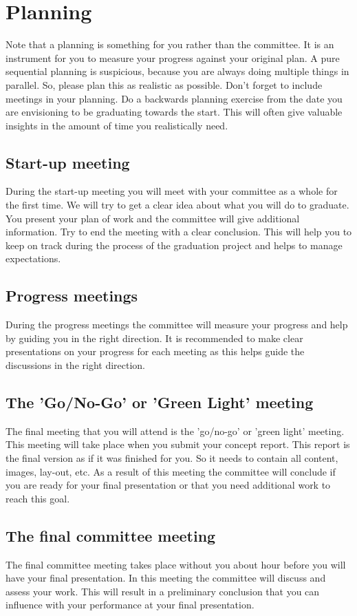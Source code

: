 \documentclass{latex-format/stylesheets/BEMNextstyle}
\begin{document}
\section*{Planning}
\label{sec:planning}
Note that a planning is something for you rather than the committee. It is an instrument for you to measure your progress against your original plan. A pure sequential planning is suspicious, because you are always doing multiple things in parallel. So, please plan this as realistic as possible. Don't forget to include meetings in your planning. Do a backwards planning exercise from the date you are envisioning to be graduating towards the start. This will often give valuable insights in the amount of time you realistically need.

\subsection*{Start-up meeting}
During the start-up meeting you will meet with your committee as a whole for the first time. We will try to get a clear idea about what you will do to graduate. You present your plan of work and the committee will give additional information. Try to end the meeting with a clear conclusion. This will help you to keep on track during the process of the graduation project and helps to manage expectations.

\subsection*{Progress meetings}
During the progress meetings the committee will measure your progress and help by guiding you in the right direction. It is recommended to make clear presentations on your progress for each meeting as this helps guide the discussions in the right direction.

\subsection*{The 'Go/No-Go' or 'Green Light' meeting}
The final meeting that you will attend is the 'go/no-go' or 'green light' meeting. This meeting will take place when you submit your concept report. This report is the final version as if it was finished for you. So it needs to contain all content, images, lay-out, etc. As a result of this meeting the committee will conclude if you are ready for your final presentation or that you need additional work to reach this goal.

\subsection*{The final committee meeting}
The final committee meeting takes place without you about hour before you will have your final presentation. In this meeting the committee will discuss and assess your work. This will result in a preliminary conclusion that you can influence with your performance at your final presentation. 
\end{document}
